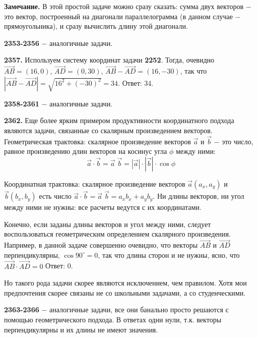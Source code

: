 \textbf{Замечание.} В этой простой задаче можно сразу сказать: сумма двух векторов $-$ это вектор, построенный на  диагонали параллелограмма (в данном случае $-$ прямоугольника), и сразу вычислить длину этой диагонали. 

\textbf{2353-2356} $-$ аналогичные задачи.

\textbf{2357.}  Используем систему координат задачи \textbf{2252}. Тогда, очевидно
$\overrightarrow{AB}=(16, 0)$, $\overrightarrow{AD} = (0, 30)$, $\overrightarrow{AB} - \overrightarrow{AD} = (16, -30)$, так что $|\overrightarrow{AB} - \overrightarrow{AD}|=\sqrt{16^2+(-30)^2}=34$. \newline \null \hspace*{\fill} Ответ: 34.

\textbf{2358-2361} $-$ аналогичные задачи.

\textbf{2362.} Еще более ярким примером продуктивности координатного подхода являются задачи, связанные со скалярным произведением векторов. Геометрическая трактовка: скалярное произведение векторов $\overrightarrow{a}$ и $\overrightarrow{b}$ $-$ это число, равное произведению длин векторов на косинус угла $\phi$ между ними:
\[
\vec{a}\cdot \vec{b}=\vec{a}\;
\vec{b}=|\vec{a}|\cdot|\vec{b}|\cdot\cos{\phi}\]

Координатная трактовка: скалярное произведение векторов \linebreak $\vec{a}(a_x, a_y)$ и $\vec{b}(b_x, b_y)$ есть число $\vec{a}\cdot \vec{b}=\vec{a}\;
\vec{b} = a_xb_x+a_yb_y$. Ни длины векторов, ни угол между ними не нужны: все расчеты ведутся с их координатами.

Конечно, если заданы длины векторов и угол между ними, следует воспользоваться геометрическим определением скалярного произведения. Например, в данной задаче совершенно очевидно, что векторы $\overrightarrow{AB}$ и $\overrightarrow{AD}$ перпендикулярны, $\cos{90^\circ}=0$, так что длины сторон и не нужны, ясно, что $\overrightarrow{AB}\cdot\overrightarrow{AD}=0$ \newline \null \hspace*{\fill} Ответ: 0.                       

Но такого рода задачи скорее являются исключением, чем правилом. Хотя мои предпочтения скорее связаны не со школьными задачами, а со студенческими.

\textbf{2363-2366} $-$ аналогичные задачи, все они банально просто решаются с помощью геометрического подхода. В ответах одни нули, т.к. векторы перпендикулярны и их длины не имеют значения.

